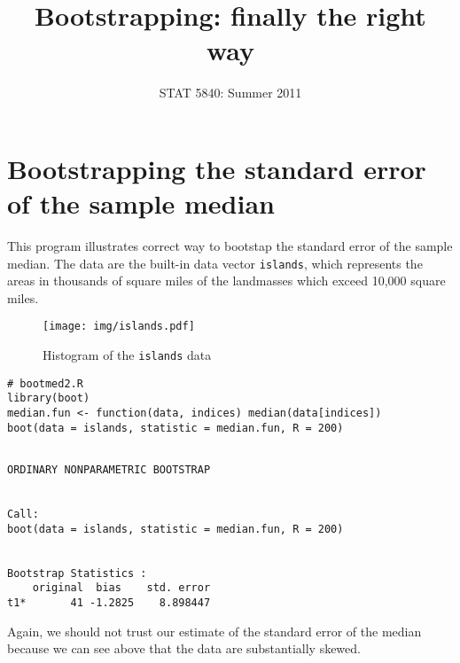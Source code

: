 \documentclass[11pt,english]{article}
\title{Bootstrapping: finally the right way}
\date{STAT 5840: Summer 2011}
\begin{document}
\maketitle

\thispagestyle{empty}

\section*{Bootstrapping the standard error of the sample median}
\label{sec-1}

This program illustrates correct way to bootstap the standard error of the sample median.  The data are the built-in data vector \texttt{islands}, which represents the areas in thousands of square miles of the landmasses which exceed 10,000 square miles.



\begin{figure}[h!]
\centering
\texttt{[image: img/islands.pdf]}
\caption{\label{fig:yplot}Histogram of the \texttt{islands} data}
\end{figure}




\begin{verbatim}
# bootmed2.R
library(boot)
median.fun <- function(data, indices) median(data[indices])
boot(data = islands, statistic = median.fun, R = 200)
\end{verbatim}





\begin{verbatim}
 
ORDINARY NONPARAMETRIC BOOTSTRAP


Call:
boot(data = islands, statistic = median.fun, R = 200)


Bootstrap Statistics :
    original  bias    std. error
t1*       41 -1.2825    8.898447
\end{verbatim}



Again, we should not trust our estimate of the standard error of the median because we can see above that the data are substantially skewed.
\end{document}
